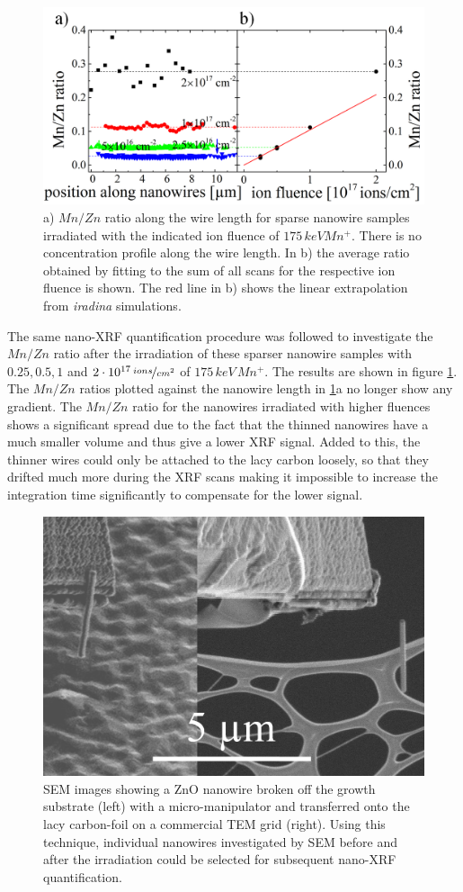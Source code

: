 \begin{figure}[th]
	\centering
		\includegraphics[width=.85\textwidth]{images/MnZn2.png}
	\caption{a) $Mn/Zn$ ratio along the wire length for sparse nanowire samples irradiated with the indicated ion fluence of $175\,keV Mn^+$. There is no concentration profile along the wire length. In b) the average ratio obtained by fitting to the sum of all scans for the respective ion fluence is shown. The red line in b) shows the linear extrapolation from \emph{iradina} simulations.}
	\label{MnZn2}
\end{figure} 

The same nano-XRF quantification procedure was followed to investigate the $Mn/Zn$ ratio after the irradiation of these sparser nanowire samples with $0.25, 0.5, 1$ and $2\cdot 10^{17}\,\nicefrac{ions}{cm^2}$ of $175\,keV\,Mn^+$. The results are shown in figure \ref{MnZn2}. The $Mn/Zn$ ratios plotted against the nanowire length in \ref{MnZn2}a no longer show any gradient. The $Mn/Zn$ ratio for the nanowires irradiated with higher fluences shows a significant spread due to the fact that the thinned nanowires have a much smaller volume and thus give a lower XRF signal. Added to this, the thinner wires could only be attached to the lacy carbon loosely, so that they drifted much more during the XRF scans making it impossible to increase the integration time significantly to compensate for the lower signal. 

\begin{figure}
	\centering
		\includegraphics[width=.5\textwidth]{images/SEMbreak.png}
	\caption{SEM images showing a ZnO nanowire broken off the growth substrate (left) with a micro-manipulator and transferred onto the lacy carbon-foil on a commercial TEM grid (right). Using this technique, individual nanowires investigated by SEM before and after the irradiation could be selected for subsequent nano-XRF quantification.}
	\label{SEMbreak}
\end{figure}

